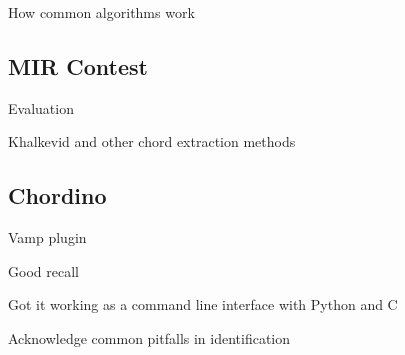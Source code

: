 \item How common algorithms work

\subsection{MIR Contest}

\item Evaluation
\item Khalkevid and other chord extraction methods

\subsection{Chordino}

\item Vamp plugin
\item Good recall
\item Got it working as a command line interface with Python and C
\item Acknowledge common pitfalls in identification